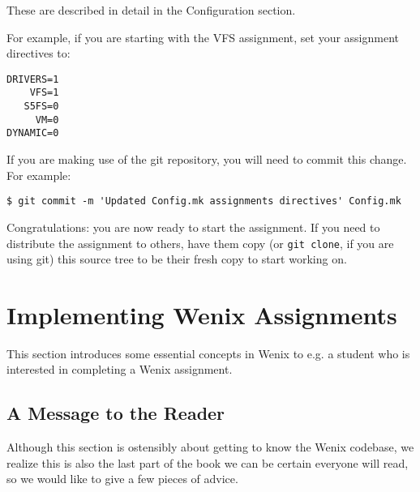 \begin{enumerate}
These are described in detail in the Configuration section.

For example, if you are starting with the VFS assignment, set your assignment directives to:

\begin{verbatim}
DRIVERS=1
    VFS=1
   S5FS=0
     VM=0
DYNAMIC=0\end{verbatim}

If you are making use of the git repository, you will need to commit this change.  For example:

\begin{verbatim}
$ git commit -m 'Updated Config.mk assignments directives' Config.mk\end{verbatim}

\end{enumerate}

Congratulations: you are now ready to start the assignment.  If you need to distribute the assignment to others, have them copy (or \texttt{git clone}, if you are using git) this source tree to be their fresh copy to start working on.

\section{Implementing Wenix Assignments}

This section introduces some essential concepts in Wenix to e.g. a student who is interested in completing a Wenix assignment.

\subsection{A Message to the Reader}
Although this section is ostensibly about getting to know the Wenix codebase, we realize this is also the last part of the book we can be certain everyone will read, so we would like to give a few pieces of advice.

